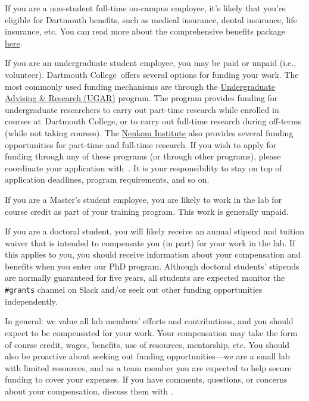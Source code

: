 \documentclass{tufte-book} %
\newcommand{\ourschool}{Dartmouth College}
\begin{document}
\noindent
If you are a non-student full-time on-campus employee, it's likely
that you're eligible for Dartmouth benefits, such as medical
insurance, dental insurance, life insurance, etc.  You can read more
about the comprehensive benefits package
\href{http://www.dartmouth.edu/~hrs/benefits/}{here}.

If you are an undergraduate student employee, you may be paid or unpaid (i.e., volunteer).
\ourschool~offers several options for funding your work. The most commonly used
funding mechanisms are through the
\href{https://students.dartmouth.edu/ugar/}{Undergraduate Advising \& Research
(UGAR)} program. The program provides funding for undergraduate researchers to
carry out part-time research while enrolled in courses at~\ourschool, or to
carry out full-time research during off-terms (while not taking courses). The
\href{https://neukom.dartmouth.edu/}{Neukom Institute} also provides several
funding opportunities for part-time and full-time research. If you wish to
apply for funding through any of these programs (or through other programs),
please coordinate your application with~\director. It is your responsibility to
stay on top of application deadlines, program requirements, and so on.

If you are a Master's student employee, you are likely to work in the lab for
course credit as part of your training program. This work is generally unpaid.

If you are a doctoral student, you will likely receive an annual stipend and
tuition waiver that is intended to compensate you (in part) for your work in
the lab. If this applies to you, you should receive information about your
compensation and benefits when you enter our PhD program. Although doctoral
students' stipends are normally guaranteed for five years, all students are
expected monitor the \texttt{\#grants} channel on Slack and/or seek out other
funding opportunities independently.

In general: we value all lab members' efforts and contributions, and you should
expect to be compensated for your work. Your compensation may take the form of
course credit, wages, benefits, use of resources, mentorship, etc. You should also be proactive about seeking out funding opportunities---we are a small lab with limited
resources, and as a team member you are expected to help
secure funding to cover your expenses. If you have comments,
questions, or concerns about your compensation, discuss them with
\director.

\end{document}
